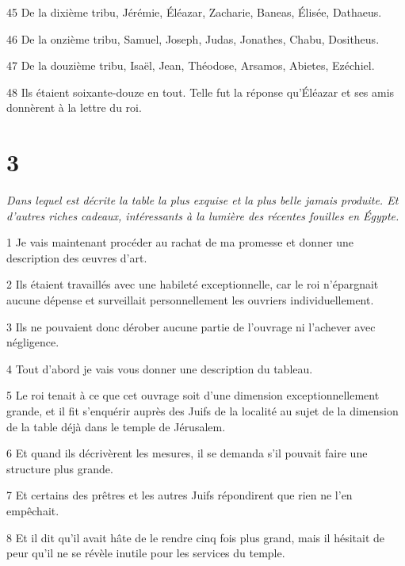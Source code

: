 \par 45 De la dixième tribu, Jérémie, Éléazar, Zacharie, Baneas, Élisée, Dathaeus.

\par 46 De la onzième tribu, Samuel, Joseph, Judas, Jonathes, Chabu, Dositheus.

\par 47 De la douzième tribu, Isaël, Jean, Théodose, Arsamos, Abietes, Ezéchiel.

\par 48 Ils étaient soixante-douze en tout. Telle fut la réponse qu'Éléazar et ses amis donnèrent à la lettre du roi.

\chapter{3}

\par \textit{Dans lequel est décrite la table la plus exquise et la plus belle jamais produite. Et d'autres riches cadeaux, intéressants à la lumière des récentes fouilles en Égypte.}

\par 1 Je vais maintenant procéder au rachat de ma promesse et donner une description des œuvres d'art.

\par 2 Ils étaient travaillés avec une habileté exceptionnelle, car le roi n'épargnait aucune dépense et surveillait personnellement les ouvriers individuellement.

\par 3 Ils ne pouvaient donc dérober aucune partie de l'ouvrage ni l'achever avec négligence.

\par 4 Tout d'abord je vais vous donner une description du tableau.

\par 5 Le roi tenait à ce que cet ouvrage soit d'une dimension exceptionnellement grande, et il fit s'enquérir auprès des Juifs de la localité au sujet de la dimension de la table déjà dans le temple de Jérusalem.

\par 6 Et quand ils décrivèrent les mesures, il se demanda s'il pouvait faire une structure plus grande.

\par 7 Et certains des prêtres et les autres Juifs répondirent que rien ne l'en empêchait.

\par 8 Et il dit qu'il avait hâte de le rendre cinq fois plus grand, mais il hésitait de peur qu'il ne se révèle inutile pour les services du temple.

